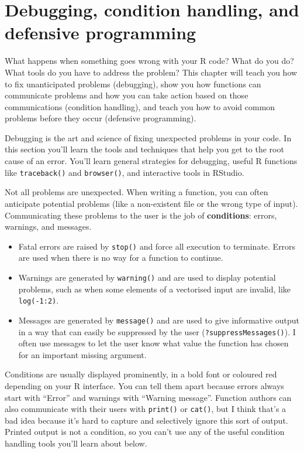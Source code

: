 \hypertarget{debugging}{%
\chapter{Debugging, condition handling, and defensive
programming}\label{debugging}}

What happens when something goes wrong with your R code? What do you do?
What tools do you have to address the problem? This chapter will teach
you how to fix unanticipated problems (debugging), show you how
functions can communicate problems and how you can take action based on
those communications (condition handling), and teach you how to avoid
common problems before they occur (defensive programming).

Debugging is the art and science of fixing unexpected problems in your
code. In this section you'll learn the tools and techniques that help
you get to the root cause of an error. You'll learn general strategies
for debugging, useful R functions like \texttt{traceback()} and
\texttt{browser()}, and interactive tools in RStudio.

Not all problems are unexpected. When writing a function, you can often
anticipate potential problems (like a non-existent file or the wrong
type of input). Communicating these problems to the user is the job of
\textbf{conditions}: errors, warnings, and messages.

\begin{itemize}
\item
  Fatal errors are raised by \texttt{stop()} and force all execution to
  terminate. Errors are used when there is no way for a function to
  continue.  
\item
  Warnings are generated by \texttt{warning()} and are used to display
  potential problems, such as when some elements of a vectorised input
  are invalid, like \texttt{log(-1:2)}.
\item
  Messages are generated by \texttt{message()} and are used to give
  informative output in a way that can easily be suppressed by the user
  (\texttt{?suppressMessages()}). I often use messages to let the user
  know what value the function has chosen for an important missing
  argument.
\end{itemize}

Conditions are usually displayed prominently, in a bold font or coloured
red depending on your R interface. You can tell them apart because
errors always start with ``Error'' and warnings with ``Warning
message''. Function authors can also communicate with their users with
\texttt{print()} or \texttt{cat()}, but I think that's a bad idea
because it's hard to capture and selectively ignore this sort of output.
Printed output is not a condition, so you can't use any of the useful
condition handling tools you'll learn about below.


